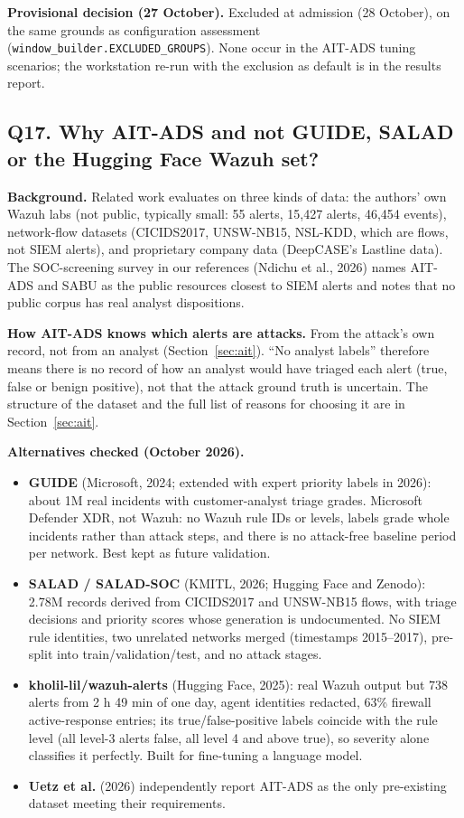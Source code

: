 \documentclass[10.5pt,a4paper]{article}
\newcommand{\dec}[1]{\par\smallskip\noindent\colorbox{blue!8}{\parbox{\dimexpr\linewidth-2\fboxsep}{\textbf{Provisional decision (27 October).} #1}}\par\medskip}
\newcommand{\sub}[1]{\par\smallskip\noindent\textbf{#1}\quad}
\begin{document}
\dec{Excluded at admission (28 October), on the same grounds as configuration assessment (\texttt{window\_builder.EXCLUDED\_GROUPS}). None occur in the AIT-ADS tuning scenarios; the workstation re-run with the exclusion as default is in the results report.}

\subsection*{Q17. Why AIT-ADS and not GUIDE, SALAD or the Hugging Face Wazuh set?}

\sub{Background.} Related work evaluates on three kinds of data: the authors' own Wazuh labs (not public, typically small: 55 alerts, 15{,}427 alerts, 46{,}454 events), network-flow datasets (CICIDS2017, UNSW-NB15, NSL-KDD, which are flows, not SIEM alerts), and proprietary company data (DeepCASE's Lastline data). The SOC-screening survey in our references (Ndichu et al., 2026) names AIT-ADS and SABU as the public resources closest to SIEM alerts and notes that no public corpus has real analyst dispositions.

\sub{How AIT-ADS knows which alerts are attacks.} From the attack's own record, not from an analyst (Section~\ref{sec:ait}). ``No analyst labels'' therefore means there is no record of how an analyst would have triaged each alert (true, false or benign positive), not that the attack ground truth is uncertain. The structure of the dataset and the full list of reasons for choosing it are in Section~\ref{sec:ait}.

\sub{Alternatives checked (October 2026).}
\begin{itemize}
\item \textbf{GUIDE} (Microsoft, 2024; extended with expert priority labels in 2026): about 1M real incidents with customer-analyst triage grades. Microsoft Defender XDR, not Wazuh: no Wazuh rule IDs or levels, labels grade whole incidents rather than attack steps, and there is no attack-free baseline period per network. Best kept as future validation.
\item \textbf{SALAD / SALAD-SOC} (KMITL, 2026; Hugging Face and Zenodo): 2.78M records derived from CICIDS2017 and UNSW-NB15 flows, with triage decisions and priority scores whose generation is undocumented. No SIEM rule identities, two unrelated networks merged (timestamps 2015--2017), pre-split into train/validation/test, and no attack stages.
\item \textbf{kholil-lil/wazuh-alerts} (Hugging Face, 2025): real Wazuh output but 738 alerts from 2 h 49 min of one day, agent identities redacted, 63\% firewall active-response entries; its true/false-positive labels coincide with the rule level (all level-3 alerts false, all level 4 and above true), so severity alone classifies it perfectly. Built for fine-tuning a language model.
\item \textbf{Uetz et al.} (2026) independently report AIT-ADS as the only pre-existing dataset meeting their requirements.
\end{itemize}
\end{document}
